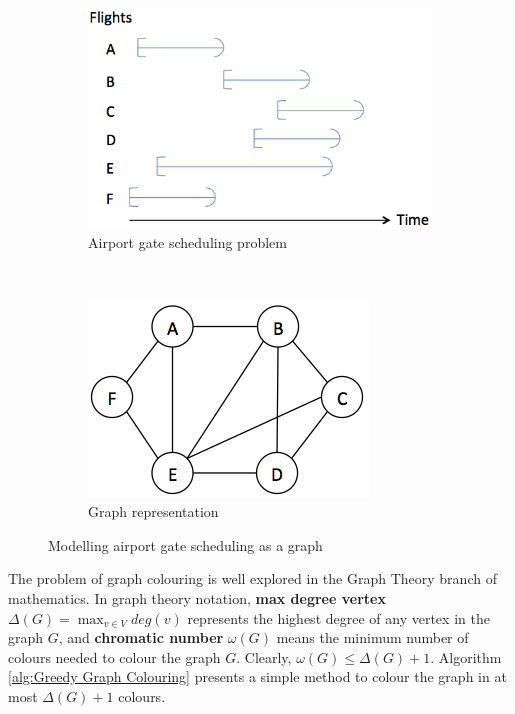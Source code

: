 \documentclass[12pt, a4paper]{report}
\begin{document}
\begin{figure}[h!]
\centering
\begin{subfigure}[b]{0.4\textwidth}
	\centering
	\includegraphics[width=\textwidth]{../figures/vanilla.png}
	\caption{Airport gate scheduling problem}
\end{subfigure}~
\begin{subfigure}[b]{0.4\textwidth}
	\centering
	\includegraphics[width=\textwidth]{../figures/graph.png}
	\caption{Graph representation}
\end{subfigure}
\caption{Modelling airport gate scheduling as a graph}
\end{figure}

The problem of graph colouring is well explored in the Graph Theory branch of mathematics. In graph theory notation, \textbf{max degree vertex} $\Delta(G) = \max_{v \in V} deg(v)$ represents the highest degree of any vertex in the graph $G$, and \textbf{chromatic number} $\omega(G)$ means the minimum number of colours needed to colour the graph $G$. Clearly, $\omega(G) \leq \Delta(G) + 1$. Algorithm \ref{alg:Greedy Graph Colouring} presents a simple method to colour the graph in at most $\Delta(G) + 1$ colours.
\end{document}
